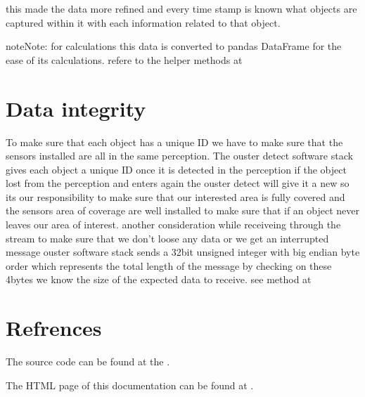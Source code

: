 \documentclass[letterpaper,10pt,english]{sphinxmanual}
\begin{document}
\sphinxAtStartPar
this made the data more refined and every time stamp is known what objects are captured within it with each information related to that object.

\begin{sphinxadmonition}{note}{Note:}
\sphinxAtStartPar
for calculations this data is converted to pandas DataFrame for the ease of its calculations. refere to the helper methods at {\hyperref[\detokenize{processing:processing-utils-ref}]{}}
\end{sphinxadmonition}


\section{Data integrity}
\label{\detokenize{projectdoc:data-integrity}}
\sphinxAtStartPar
To make sure that each object has a unique ID we have to make sure that the sensors installed are all in the same perception.
The ouster detect software stack gives each object a unique ID  once it is detected in the perception if the object lost from the perception and enters again
the ouster detect will give it a new  so its our responsibility to make sure that our interested area is fully covered and the sensors area of coverage are well
installed to make sure that if an object never leaves our area of interest. another consideration while receiveing through the stream to make sure that we don’t loose any
data or we get an interrupted message ouster software stack sends a 32\sphinxhyphen{}bit unsigned integer with big endian byte order which represents the total length of the message
by checking on these 4\sphinxhyphen{}bytes we know the size of the expected data to receive. see  method at {\hyperref[\detokenize{processing:processing-data-ref}]{}}


\section{Refrences}
\label{\detokenize{projectdoc:refrences}}
\sphinxAtStartPar
The source code can be found at the  .

\sphinxAtStartPar
The HTML page of this documentation can be found at .
\end{document}

